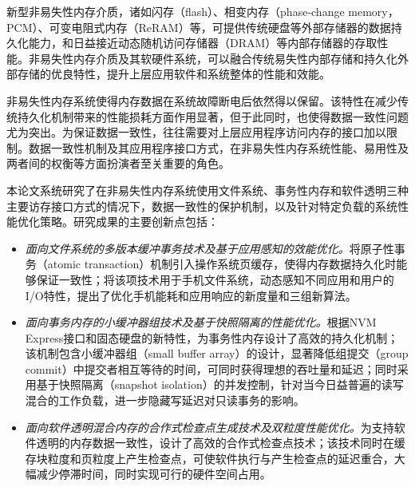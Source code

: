 \begin{cabstract}
    新型非易失性内存介质，诸如闪存（flash）、相变内存（phase-change
memory，PCM）、可变电阻式内存（ReRAM）等，可提供传统硬盘等外部存储器的数据持久化能力，和日益接近动态随机访问存储器（DRAM）等内部存储器的存取性能。非易失性内存介质及其软硬件系统，可以融合传统易失性内部存储和持久化外部存储的优良特性，提升上层应用软件和系统整体的性能和效能。

    非易失性内存系统使得内存数据在系统故障断电后依然得以保留。该特性在减少传统持久化机制带来的性能损耗方面作用显著，但于此同时，也使得数据一致性问题尤为突出。为保证数据一致性，往往需要对上层应用程序访问内存的接口加以限制。数据一致性机制及其应用程序接口方式，在非易失性内存系统性能、易用性及两者间的权衡等方面扮演者至关重要的角色。

    本论文系统研究了在非易失性内存系统使用文件系统、事务性内存和软件透明三种主要访存接口方式的情况下，数据一致性的保护机制，以及针对特定负载的系统性能优化策略。研究成果的主要创新点包括：

  \begin{itemize}
    \item \emph{面向文件系统的多版本缓冲事务技术及基于应用感知的效能优化。}将原子性事务（atomic transaction）机制引入操作系统页缓存，使得内存数据持久化时能够保证一致性；将该项技术用于手机文件系统，动态感知不同应用和用户的I/O特性，提出了优化手机能耗和应用响应的新度量和三组新算法。
    \item \emph{面向事务内存的小缓冲器组技术及基于快照隔离的性能优化。}根据NVM Express接口和固态硬盘的新特性，为事务性内存设计了高效的持久化机制；该机制包含小缓冲器组（small buffer array）的设计，显著降低组提交（group commit）中提交者相互等待的时间，可同时获得理想的吞吐量和延迟；同时采用基于快照隔离（snapshot isolation）的并发控制，针对当今日益普遍的读写混合的工作负载，进一步隐藏写延迟对只读事务的影响。
    \item \emph{面向软件透明混合内存的合作式检查点生成技术及双粒度性能优化。}为支持软件透明的内存数据一致性，设计了高效的合作式检查点技术；该技术同时在缓存块粒度和页粒度上产生检查点，可使软件执行与产生检查点的延迟重合，大幅减少停滞时间，同时实现可行的硬件空间占用。
  \end{itemize}

\end{cabstract}



